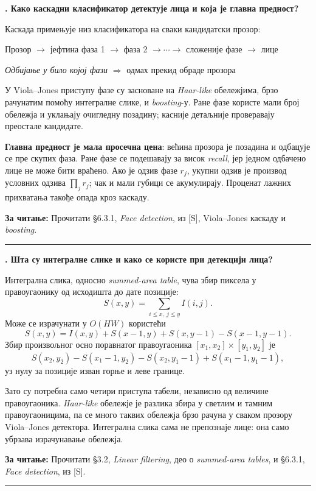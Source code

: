 \documentclass[10pt,a4paper]{article}
\newcommand{\en}[1]{\textit{#1}}
\newcounter{pitanje}
\newenvironment{odgovor}[1]{\stepcounter{pitanje}\begin{minipage}[t][0.455\textheight][t]{\textwidth}\vspace{0pt}\textbf{\thepitanje. #1}\par\smallskip}{\end{minipage}\par\ifodd\value{pitanje}\vspace{0.025\textheight}\hrule\vspace{0.015\textheight}\else\newpage\fi}
\newcommand{\izvor}[1]{\par\vfill{\footnotesize\textbf{За читање:} #1}\par}
\newcommand{\lanac}[1]{\begin{center}\small #1\end{center}}
\begin{document}
\begin{odgovor}{Како каскадни класификатор детектује лица и која је главна предност?}
Каскада примењује низ класификатора на сваки кандидатски прозор:
\lanac{Прозор $\to$ јефтина фаза 1 $\to$ фаза 2 $\to\cdots\to$ сложеније фазе $\to$ лице}
\lanac{\textit{Одбијање у било којој фази} $\Longrightarrow$ одмах прекид обраде прозора}
У Viola--Jones приступу фазе су засноване на \en{Haar-like} обележјима, брзо рачунатим помоћу интегралне слике, и \en{boosting}-у. Ране фазе користе мали број обележја и уклањају очигледну позадину; касније детаљније проверавају преостале кандидате.

\textbf{Главна предност је мала просечна цена}: већина прозора је позадина и одбацује се пре скупих фаза. Ране фазе се подешавају за висок \en{recall}, јер једном одбачено лице не може бити враћено. Ако је одзив фазе $r_j$, укупни одзив је производ условних одзива $\prod_jr_j$; чак и мали губици се акумулирају. Проценат лажних прихватања такође опада кроз каскаду.
\izvor{Прочитати §6.3.1, \en{Face detection}, из [S], Viola--Jones каскаду и \en{boosting}.}
\end{odgovor}

\begin{odgovor}{Шта су интегралне слике и како се користе при детекцији лица?}
Интегрална слика, односно \en{summed-area table}, чува збир пиксела у правоугаонику од исходишта до дате позиције:
\[
S(x,y)=\sum_{i\leq x,\ j\leq y}I(i,j).
\]
Може се израчунати у $O(HW)$ користећи
\[
S(x,y)=I(x,y)+S(x-1,y)+S(x,y-1)-S(x-1,y-1).
\]
Збир произвољног осно поравнатог правоугаоника $[x_1,x_2]\times[y_1,y_2]$ је
\[
S(x_2,y_2)-S(x_1-1,y_2)-S(x_2,y_1-1)+S(x_1-1,y_1-1),
\]
уз нулу за позиције изван горње и леве границе.

Зато су потребна само четири приступа табели, независно од величине правоугаоника. \en{Haar-like} обележје је разлика збира у светлим и тамним правоугаоницима, па се много таквих обележја брзо рачуна у сваком прозору Viola--Jones детектора. Интегрална слика сама не препознаје лице: она само убрзава израчунавање обележја.
\izvor{Прочитати §3.2, \en{Linear filtering}, део о \en{summed-area tables}, и §6.3.1, \en{Face detection}, из [S].}
\end{odgovor}
\end{document}
